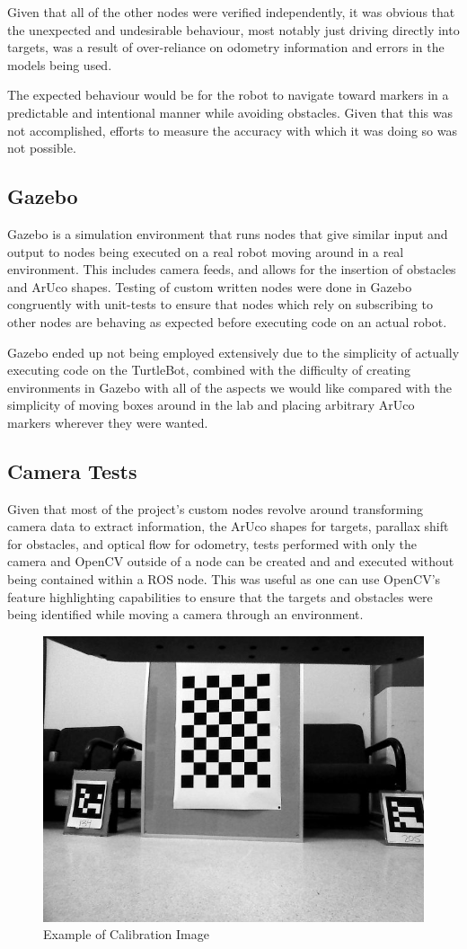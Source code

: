 \documentclass{article}[12]
\begin{document}
	Given that all of the other nodes were verified independently, it was obvious that the unexpected and undesirable behaviour, most notably just driving directly into targets, was a result of over-reliance on odometry information and errors in the models being used. 
	
	The expected behaviour would be for the robot to navigate toward markers in a predictable and intentional manner while avoiding obstacles. Given that this was not accomplished, efforts to measure the accuracy with which it was doing so was not possible.
	
	\subsection{Gazebo}
	
	Gazebo is a simulation environment that runs nodes that give similar input and output to nodes being executed on a real robot moving around in a real environment. This includes camera feeds, and allows for the insertion of obstacles and ArUco shapes. Testing of custom written nodes were done in Gazebo congruently with unit-tests to ensure that nodes which rely on subscribing to other nodes are behaving as expected before executing code on an actual robot.
	
	Gazebo ended up not being employed extensively due to the simplicity of actually executing code on the TurtleBot, combined with the difficulty of creating environments in Gazebo with all of the aspects we would like compared with the simplicity of moving boxes around in the lab and placing arbitrary ArUco markers wherever they were wanted.
	
	\subsection{Camera Tests}
	
	Given that most of the project's custom nodes revolve around transforming camera data to extract information, the ArUco shapes for targets, parallax shift for obstacles, and optical flow for odometry, tests performed with only the camera and OpenCV outside of a node can be created and and executed without being contained within a ROS node. This was useful as one can use OpenCV's feature highlighting capabilities to ensure that the targets and obstacles were being identified while moving a camera through an environment. 
	
	\begin{figure}[]
		\centering
		\includegraphics[width=0.5\linewidth]{calibration}
		\caption{Example of Calibration Image}
		\label{fig:calbcalbcalb}
	\end{figure}
	
\end{document}

